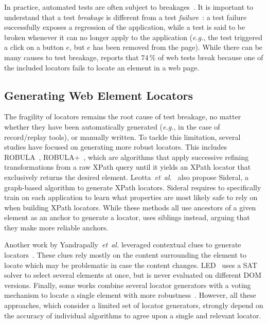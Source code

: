 In practice, automated tests are often subject to breakages~\cite{hammoudi2016record}.
It is important to understand that a test \textit{breakage} is different from a test \textit{failure}~\cite{stocco2018visual}: a test failure successfully exposes a regression of the application, while a test is said to be broken whenever it can no longer apply to the application (\emph{e.g.}, the test triggered a click on a button $e$, but $e$ has been removed from the page).
While there can be many causes to test breakage, \cite{hammoudi2016record} reports that $74\,\%$ of web tests break because one of the included locators fails to locate an element in a web page.


\subsection{Generating Web Element Locators}\label{erratum:sec:sota_robust_locator}
The fragility of locators remains the root cause of test breakage, no matter
whether they have been automatically generated (\emph{e.g.}, in the case of
record/replay tools), or manually written. To tackle this limitation, several
studies have focused on generating more robust locators. This includes
ROBULA~\cite{leotta2014reducing}, ROBULA+~\cite{leotta2016robula+}, which are algorithms that apply successive refining transformations from a raw XPath query until it yields an XPath locator that exclusively returns the desired element. Leotta~\emph{et~al.}~\cite{leotta2015meta,leotta2021sidereal} also propose
Sideral, a graph-based algorithm to generate XPath locators. Sideral requires to
specifically train on each application to learn what properties are
most likely safe to rely on when building XPath locators. While these methods
all use ancestors of a given element as an anchor to generate a locator,
\cite{nguyen2021generating} uses siblings instead, arguing that they make more
reliable anchors.

Another work by Yandrapally~\emph{et~al.} leveraged
contextual clues to generate locators~\cite{yandrapally2014robust}. These clues
rely mostly on the content surrounding the element to locate which may be
problematic in case the content changes. LED~\cite{bajaj2015synthesizing} uses a
SAT solver to select several elements at once, but is never evaluated on
different DOM versions. Finally, some works combine several locator generators
with a voting mechanism to locate a single element with more
robustness~\cite{leotta2015using, zheng2018method, long2020webrr}. However, all
these approaches, which consider a limited set of locator generators, strongly
depend on the accuracy of individual algorithms to agree upon a single and
relevant locator.


